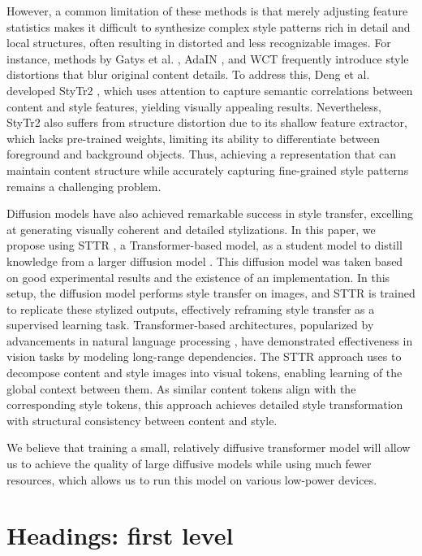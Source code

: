 \documentclass{article}
\begin{document}
    However, a common limitation of these methods is that merely adjusting feature statistics makes it difficult to synthesize complex style patterns rich in detail and local structures, often resulting in distorted and less recognizable images. For instance, methods by Gatys et al. \cite{method 10}, AdaIN \cite{method 14}, and WCT \cite{method 15} frequently introduce style distortions that blur original content details. To address this, Deng et al. developed StyTr2 \cite{method 18}, which uses attention to capture semantic correlations between content and style features, yielding visually appealing results. Nevertheless, StyTr2 also suffers from structure distortion due to its shallow feature extractor, which lacks pre-trained weights, limiting its ability to differentiate between foreground and background objects. Thus, achieving a representation that can maintain content structure while accurately capturing fine-grained style patterns remains a challenging problem.
    
    Diffusion models \cite{method 1, method 2, method 3, method 4} have also achieved remarkable success in style transfer, excelling at generating visually coherent and detailed stylizations. In this paper, we propose using STTR \cite{method 5}, a Transformer-based model, as a student model to distill knowledge from a larger diffusion model \cite{method 4}. This diffusion model was taken based on good experimental results and the existence of an implementation. In this setup, the diffusion model \cite{method 4} performs style transfer on images, and STTR \cite{method 5} is trained to replicate these stylized outputs, effectively reframing style transfer as a supervised learning task. Transformer-based architectures, popularized by advancements in natural language processing \cite{method 19}, have demonstrated effectiveness in vision tasks by modeling long-range dependencies. The STTR \cite{method 5} approach uses to decompose content and style images into visual tokens, enabling learning of the global context between them. As similar content tokens align with the corresponding style tokens, this approach achieves detailed style transformation with structural consistency between content and style.

    We believe that training a small, relatively diffusive transformer model will allow us to achieve the quality of large diffusive models while using much fewer resources, which allows us to run this model on various low-power devices.

\section{Headings: first level}
\label{sec:headings}
\end{document}
